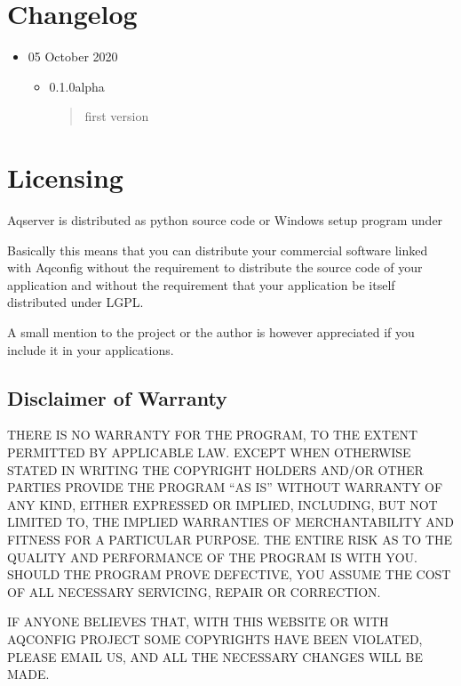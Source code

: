 \documentclass[a4paper,10pt,english]{sphinxmanual}
\begin{document}
\chapter{Changelog}
\label{\detokenize{changelog:changelog}}\label{\detokenize{changelog::doc}}\begin{itemize}
\item {} 
05 October 2020
\begin{itemize}
\item {} 
0.1.0alpha
\begin{quote}

first version
\end{quote}

\end{itemize}

\end{itemize}


\chapter{Licensing}
\label{\detokenize{license:licensing}}\label{\detokenize{license::doc}}
Aqserver is distributed as python source code or Windows setup program under

Basically this means that you can distribute your commercial software
linked with Aqconfig without the requirement to distribute the source
code of your application and without the requirement that your
application be itself distributed under LGPL.

A small mention to the project or the author is however appreciated
if you include it in your applications.


\section{Disclaimer of Warranty}
\label{\detokenize{license:disclaimer-of-warranty}}
THERE IS NO WARRANTY FOR THE PROGRAM, TO THE EXTENT PERMITTED BY
APPLICABLE LAW. EXCEPT WHEN OTHERWISE STATED IN WRITING THE
COPYRIGHT HOLDERS AND/OR OTHER PARTIES PROVIDE THE PROGRAM “AS IS”
WITHOUT WARRANTY OF ANY KIND, EITHER EXPRESSED OR IMPLIED,
INCLUDING, BUT NOT LIMITED TO, THE IMPLIED WARRANTIES OF
MERCHANTABILITY AND FITNESS FOR A PARTICULAR PURPOSE. THE ENTIRE
RISK AS TO THE QUALITY AND PERFORMANCE OF THE PROGRAM IS WITH YOU.
SHOULD THE PROGRAM PROVE DEFECTIVE, YOU ASSUME THE COST OF ALL
NECESSARY SERVICING, REPAIR OR CORRECTION.

IF ANYONE BELIEVES THAT, WITH THIS WEBSITE OR WITH AQCONFIG PROJECT
SOME COPYRIGHTS HAVE BEEN VIOLATED, PLEASE EMAIL US, AND ALL THE
NECESSARY CHANGES WILL BE MADE.



\renewcommand{\indexname}{Index}
\printindex
\end{document}
